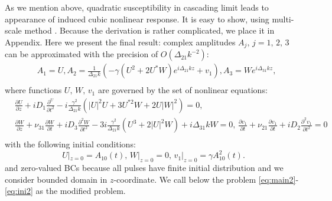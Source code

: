 \documentclass[a4paper, 12pt, onecolumn]{extarticle}
\begin{document}
As we mention above, quadratic susceptibility in cascading limit leads to appearance of induced cubic nonlinear response. It is easy to show, using multi-scale method \cite{bib:n24}. Because the derivation is rather complicated, we place it in Appendix. Here we present the final result: complex amplitudes $A_j,\,j=1,\,2,\,3$ can be approximated with the precision of $O(\Delta_{21}k^{-2})$: 
\begin{equation}
\label{eq:exp3}
\begin{aligned}
&A_1=U, A_2=\frac{1}{\Delta_{21}k}(-\gamma (U^2+2U^*W)e^{i\Delta_{21}kz}+v_1), A_3=We^{i\Delta_{31}kz},\\
\end{aligned}
\end{equation}
where functions \(U,\,W,\,v_1\) are governed by the set of nonlinear equations:
\begin{equation}
\label{eq:main2}
\begin{aligned}
&\frac{\partial U}{\partial z}+iD_1\frac{\partial^ U}{\partial t^2}-i\frac{\gamma^2}{\Delta_{21} k}(|U|^2U+3U^{*2}W+2U|W|^2)=0,\\
&\frac{\partial W}{\partial z}+\nu_{31}\frac{\partial W}{\partial t}+iD_3\frac{\partial^2 W}{\partial t^2}-3i\frac{\gamma^2}{\Delta_{21} k}(U^3+2|U|^2W)+i\Delta_{31}kW=0,\,\frac{\partial v_1}{\partial t}+\nu_{21}\frac{\partial v_1}{\partial t}+iD_2\frac{\partial^2 v_1}{\partial t^2}=0\\
\end{aligned}
\end{equation}
with the following initial conditions:
\begin{equation}
\label{eq:ini2}
U|_{z=0}=A_{10}(t),\,W|_{z=0}=0,\,v_1|_{z=0}=\gamma A_{10}^2(t).
\end{equation}
and zero-valued BCs because all pulses have finite initial distribution and we consider bounded domain in \(z\)-coordinate. We call below the problem \eqref{eq:main2}-\eqref{eq:ini2} as the modified problem.
\end{document}

